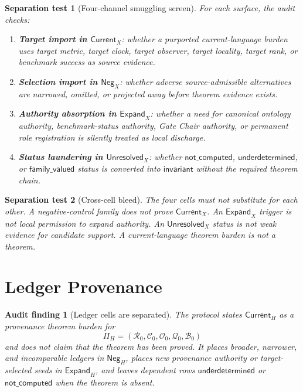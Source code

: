 \documentclass[11pt]{article}
\newcommand{\Current}{\mathsf{Current}}
\newcommand{\Neg}{\mathsf{Neg}}
\newcommand{\Expand}{\mathsf{Expand}}
\newcommand{\Unres}{\mathsf{Unresolved}}
\newtheorem{auditfinding}{Audit finding}
\newtheorem{separationtest}{Separation test}
\begin{document}
\begin{separationtest}[Four-channel smuggling screen]
For each surface, the audit checks:
\begin{enumerate}
    \item \textbf{Target import in \(\Current_X\)}: whether a purported
    current-language burden uses target metric, target clock, target observer,
    target locality, target rank, or benchmark success as source evidence.
    \item \textbf{Selection import in \(\Neg_X\)}: whether adverse
    source-admissible alternatives are narrowed, omitted, or projected away
    before theorem evidence exists.
    \item \textbf{Authority absorption in \(\Expand_X\)}: whether a need for
    canonical ontology authority, benchmark-status authority, Gate Chair
    authority, or permanent role registration is silently treated as local
    discharge.
    \item \textbf{Status laundering in \(\Unres_X\)}: whether
    \(\mathsf{not\_computed}\), \(\mathsf{underdetermined}\), or
    \(\mathsf{family\_valued}\) status is converted into
    \(\mathsf{invariant}\) without the required theorem chain.
\end{enumerate}
\end{separationtest}

\begin{separationtest}[Cross-cell bleed]
The four cells must not substitute for each other. A negative-control family
does not prove \(\Current_X\). An \(\Expand_X\) trigger is not local
permission to expand authority. An \(\Unres_X\) status is not weak evidence
for candidate support. A current-language theorem burden is not a theorem.
\end{separationtest}

\section{Ledger Provenance}

\begin{auditfinding}[Ledger cells are separated]
The protocol states \(\Current_H\) as a provenance theorem burden for
\[
\Pi_H=(\mathcal{R}_{0},\mathcal{C}_{0},\mathcal{O}_{0},
\mathcal{Q}_{0},\mathcal{B}_{0})
\]
and does not claim that the theorem has been proved. It places broader,
narrower, and incomparable ledgers in \(\Neg_H\), places new provenance
authority or target-selected seeds in \(\Expand_H\), and leaves dependent
rows \(\mathsf{underdetermined}\) or \(\mathsf{not\_computed}\) when the
theorem is absent.
\end{auditfinding}
\end{document}
